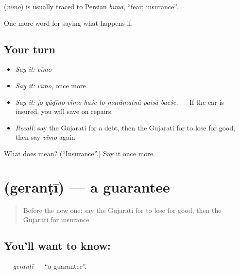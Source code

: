 \begin{cousinweb}
\textbf{} (\emph{vīmo}) is usually traced to Persian \emph{bīma}, \textquotedblleft{}fear; insurance\textquotedblright{}.
\end{cousinweb}

\begin{grammarlens}[title={What you've built}]
One more word for saying what happens if.
\end{grammarlens}

\subsection*{Your turn}
\begin{itemize}
\raggedright
  \item \emph{Say it:} \emph{vīmo}
  \item \emph{Say it:} \emph{vīmo}, once more
  \item \emph{Say it:} \emph{jo gāḍīno vīmo haśe to marāmatnā paisā bacśe.} — If the car is insured, you will save on repairs.
  \item \emph{Recall:} say the Gujarati for a debt, then the Gujarati for to lose for good, then say \emph{vīmo} again
\end{itemize}

\begin{tcolorbox}[breakable,colback=teal!4,colframe=teal!35!black,title={Before you move on}]
What does  mean? (\textquotedblleft{}Insurance\textquotedblright{}.) Say it once more.
\end{tcolorbox}
\section[\texorpdfstring{\gu{ગેરંટી} (geranṭī)}{ગેરંટી (geranṭī)}]{ (geranṭī) — a guarantee}

\label{lesson:GU-C372-geranti}



\begin{quote}
Before the new one: say the Gujarati for to lose for good, then the Gujarati for insurance.
\end{quote}

\subsection*{You'll want to know: }
\textbf{} — \emph{geranṭī} — \textquotedblleft{}a guarantee\textquotedblright{}.

